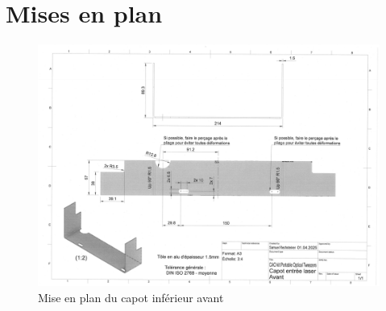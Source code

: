 
\newpage
\section*{Mises en plan} \label{Mises_En_Plan}
\begin{figure}[H]
    \centering
    \includegraphics[angle=90,width=\textwidth]{assets/figures/Annexes/Mises_en_plan/mise_en_plan_avant.png}
    \caption{Mise en plan du capot inférieur avant}
    \label{mise_en_plan_capot_avant}
\end{figure}

